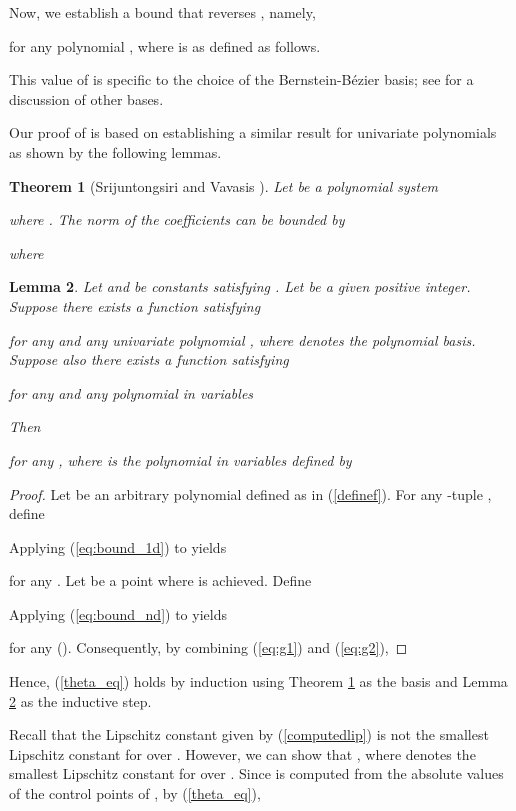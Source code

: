 \documentclass{article}
\newcommand\eref[1]{}
\newtheorem{theorem}{Theorem}[section]
\newtheorem{lemma}[theorem]{Lemma}
\begin{document}
Now, we establish a bound that reverses \eref{eq:fMbound},
namely,

for any polynomial , where  is as
defined as follows.

This value of   is specific to the choice of the
Bernstein-B\'ezier
basis; see \cite{srijuntongsiri_basis} for a discussion of other bases.


Our proof of \eref{theta_eq} is based on establishing a similar
result for univariate polynomials as shown by the following
lemmas.
\begin{theorem}[Srijuntongsiri and Vavasis \cite{srijuntongsiri_basis}]
\label{bibound} Let  be a polynomial system

where . The norm of the coefficients can
be bounded by

where

\end{theorem}

\begin{lemma}
\label{theta_to_gen} 
Let  and  be constants satisfying .  Let  be a given positive integer.  Suppose there exists a function  satisfying

for any   and any univariate polynomial
, where  denotes the
polynomial basis.  Suppose also there exists a function  satisfying

for any   and any polynomial in  variables 

Then

for any  , where
 is the 
polynomial in  variables defined by 

\end{lemma}
\begin{proof}
Let  be an arbitrary polynomial defined as in (\ref{definef}).  For any -tuple  , define 

Applying (\ref{eq:bound_1d}) to  yields

for any  .  Let  be a point where  is achieved.  Define 

Applying (\ref{eq:bound_nd}) to  yields

for any  ().  Consequently, by combining (\ref{eq:g1}) and (\ref{eq:g2}),

\end{proof}

Hence, (\ref{theta_eq}) holds by induction using Theorem \ref{bibound} as the basis and Lemma \ref{theta_to_gen} as the inductive step.

Recall that the Lipschitz constant  given by
(\ref{computedlip}) is not the smallest Lipschitz constant for
 over . However, we
can show that , where 
denotes the smallest Lipschitz constant for  over
. Since  is computed from the absolute values of
the control points of , by (\ref{theta_eq}),
\end{document}
